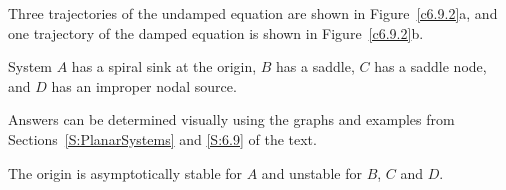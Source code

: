 \documentclass{ximera}
\begin{document}
Three trajectories of the undamped equation are shown in Figure~\ref{c6.9.2}a,
and one trajectory of the damped equation is shown in Figure~\ref{c6.9.2}b.




\begin{figure}[htb]
                       \centerline{%
                       }
\end{figure}

 \ans System $A$ has a spiral sink at the origin, $B$ has a
saddle, $C$ has a saddle node, and $D$ has an improper nodal source.

\soln Answers can be determined visually using the graphs and examples
from Sections~\ref{S:PlanarSystems} and \ref{S:6.9} of the text.

 \ans The origin is asymptotically stable for $A$ and unstable
for $B$, $C$ and $D$.
\end{document}
